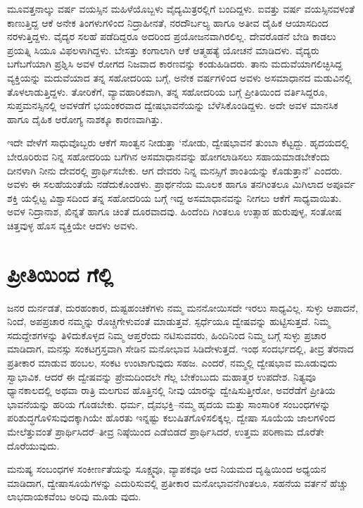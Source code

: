 ಮೂವತ್ತನಾಲ್ಕು ವರ್ಷ ವಯಸ್ಸಿನ ಮಹಿಳೆಯೊಬ್ಬಳು ವೈದ್ಯಮಿತ್ರರಲ್ಲಿಗೆ ಬಂದಿದ್ದಳು. ಐವತ್ತು ವರ್ಷ ವಯಸ್ಸಿನವಳಂತೆ ಕಾಣುತ್ತಿದ್ದ ಆಕೆ ಅನೇಕ ತಿಂಗಳುಗಳಿಂದ ನಿದ್ರಾಹೀನತೆ, ನರದೌರ್ಬಲ್ಯ ಹಾಗೂ ಅತೀವ ದೈಹಿಕ ಆಯಾಸದಿಂದ ನರಳುತ್ತಿದ್ದಳು. ವೈದ್ಯರ ಸಲಹೆ ಪಡೆದಿದ್ದರೂ ಅದರಿಂದ ಪ್ರಯೋಜನವಾಗಿರಲಿಲ್ಲ. ದೇವರೊಡನೆ ಬೇಡಿ ಕಾಡಲು ಪ್ರಯತ್ನಿ ಸಿಯೂ ವಿಫಲಳಾಗಿದ್ದಳು. ಬೇಸತ್ತು ಕಂಗಾಲಾಗಿ ಆಕೆ ಆತ್ಮಹತ್ಯೆ ಯೋಚನೆ ಮಾಡಿದಳು. ವೈದ್ಯರು ಬಗೆಬಗೆಯಾಗಿ ಪ್ರಶ್ನಿಸಿ ಅವಳ ರೋಗದ ನಿಜವಾದ ಕಾರಣವನ್ನು ಕಂಡುಹಿಡಿದರು. ತಾನು ಮದುವೆಯಾಗಲಿಚ್ಛಿಸಿದ್ದ ವ್ಯಕ್ತಿಯನ್ನು ಮದುವೆಯಾದ ತನ್ನ ಸಹೋದರಿಯ ಬಗ್ಗೆ, ಅನೇಕ ವರ್ಷಗಳಿಂದ ಅವಳು ಅಸಮಾಧಾನದ ಮಡುವಿನಲ್ಲಿ ತೊಳಲಾಡುತ್ತಿದ್ದಳು. ತೋರಿಕೆಗೆ, ವ್ಯಾವಹಾರಿಕವಾಗಿ, ತನ್ನ ಸಹೋದರಿಯ ಬಗ್ಗೆ ಪ್ರೀತಿಯಿಂದ ವರ್ತಿಸಿದ್ದರೂ, ಸುಪ್ತಮನಸ್ಸಿನಲ್ಲಿ ಅವಳಡೆಗೆ ಭಯಂಕರವಾದ ದ್ವೇಷಭಾವನೆಯನ್ನು ಬೆಳೆಸಿಕೊಂಡಿದ್ದಳು. ಅದೇ ಅವಳ ಮಾನಸಿಕ ಹಾಗೂ ದೈಹಿಕ ಆರೋಗ್ಯ ನಾಶಕ್ಕೂ ಕಾರಣವಾಗಿತ್ತು.

ಇದೇ ವೇಳೆಗೆ ಸಾಧುವೊಬ್ಬರು ಆಕೆಗೆ ಸಾಂತ್ವನ ನೀಡುತ್ತಾ ‘ನೋಡು, ದ್ವೇಷಭಾವನೆ ತುಂಬಾ ಕೆಟ್ಟದ್ದು. ಹೃದಯದಲ್ಲಿ ಬೇರೂರಿರುವ ನಿನ್ನ ಸಹೋದರಿಯ ಬಗೆಗಿನ ಅಸಮಾಧಾನವನ್ನು ಹೋಗಲಾಡಿಸಲು ಸಹಾಯಮಾಡಬೇಕೆಂದು ದೀನಳಾಗಿ ನೀನು ದೇವರಲ್ಲಿ ಪ್ರಾರ್ಥಿಸಬೇಕು. ಆಗ ದೇವರು ನಿನ್ನ ಮನಸ್ಸಿಗೆ ಶಾಂತಿಯನ್ನು ಕೊಡುತ್ತಾನೆ’ ಎಂದರು. ಅವಳು ಈ ಸಲಹೆಯಂತೆಯೆ ನಡೆದುಕೊಂಡಳು. ಪ್ರಾರ್ಥನೆಯ ಮೂಲಕ ಹಾಗೂ ತನಗಿಂತಲೂ ಮಿಗಿಲಾದ ಅಪೂರ್ವ ಶಕ್ತಿ ಯಲ್ಲಿಟ್ಟ ವಿಶ್ವಾಸದಿಂದ ತನ್ನ ಸಹೋದರಿಯ ಬಗ್ಗೆ ಇದ್ದ ಅಸಮಾಧಾನವನ್ನು ನೀಗಲು ಆಕೆಗೆ ಸಾಧ್ಯವಾಯಿತು. ಅವಳ ನಿದ್ರಾನಾಶ, ಖಿನ್ನತೆ ಹಾಗೂ ಚಿಂತೆ ದೂರವಾದವು. ಹಿಂದೆಂದಿ ಗಿಂತಲೂ ಉತ್ಸಾಹ ಹುರುಪುಳ್ಳ, ಸಂತೋಷ ಚಿತ್ತವುಳ್ಳ ಹೊಸ ವ್ಯಕ್ತಿಯೇ ಆದಳು ಅವಳು.


\section{ಪ್ರೀತಿಯಿಂದ ಗೆಲ್ಲಿ}

ಜನರ ದುರ್ನಡತೆ, ದುರಹಂಕಾರ, ದುಷ್ಟಹಂಚಿಕೆಗಳು ನಮ್ಮ ಮನನೋಯಿಸದೇ ಇರಲು ಸಾಧ್ಯವಿಲ್ಲ. ಸುಳ್ಳು ಆಪಾದನೆ, ನಿಂದೆ, ಅಪಪ್ರಚಾರ ನಮ್ಮನ್ನು ರೊಚ್ಚಿಗೇಳುವಂತೆ ಮಾಡುತ್ತವೆ. ಸ್ಪರ್ಧೆಯೂ ದ್ವೇಷವನ್ನು ಹುಟ್ಟಿಸುತ್ತದೆ. ನಿಮ್ಮ ಸದುದ್ದೇಶಗಳನ್ನು ತಿಳಿದುಕೊಳ್ಳದ ನಿಮ್ಮ ಆಪ್ತರೆಂದು ನಟಿಸುವವರು, ಹಿಂದಿನಿಂದ ನಿಮ್ಮ ಬಗ್ಗೆ ಸುಳ್ಳು ಪ್ರಚಾರ ಮಾಡಿದಾಗ, ಮನಸ್ಸು ಸಂಕಟಗ್ರಸ್ತವಾಗಿ ಸೇಡಿನ ಮನೋಭಾವ ಸಿಡಿದೇಳುತ್ತದೆ. ಇಂಥ ಸಂದರ್ಭದಲ್ಲಿ, ತೀವ್ರ ತೆರನಾದ ಪ್ರತೀಕಾರ ಮಾಡುವ ಹಂಬಲ, ಸಂಕಟ ಉಂಟಾಗುವುದು ಸಹಜ. ಎಂದರೆ, ನಮ್ಮಲ್ಲಿ ದ್ವೇಷಭಾವ ಮೂಡುವುದು ಸ್ವಾಭಾವಿಕ. ಆದರೆ ಈ ದ್ವೇಷವನ್ನು ಪ್ರೇಮದಿಂದಲೇ ಗೆಲ್ಲ ಬೇಕೆಂಬುದು ಮಹಾತ್ಮರ ಉಪದೇಶ. ನಿತ್ಯವೂ ಧ್ಯಾನಕಾಲದಲ್ಲಿ ಅಥವಾ ರಾತ್ರಿ ಮಲಗುವ ಹೊತ್ತಿನಲ್ಲಿ ನೀವು ಯಾರನ್ನು ದ್ವೇಷಿಸುತ್ತೀರೋ, ಅವರೆಡೆಗೆ ಪ್ರೀತಿಯ ಭಾವನೆಯನ್ನು ಹರಿಯ ಗೊಡಬೇಕು. ಧರ್ಮ, ದೈವಭಕ್ತಿ–ನಮ್ಮ ಹೃದಯ ಮತ್ತು ಸಾಂಸಾರಿಕ ಸಂಬಂಧಗಳನ್ನು ಪರಿಶುದ್ಧಗೊಳಿಸುವುದಕ್ಕಾಗಿಯೇ ಹೊರತು ಇನ್ನಷ್ಟು ಕಲುಷಿತಗೊಳಿಸಲಿಕ್ಕಲ್ಲ. ದ್ವೇಷಾ ಸೂಯೆಯ ಜಾಲಗಳಿಂದ ಮೇಲೆತ್ತುವಂತೆ ಪ್ರಾರ್ಥಿಸಿದರೆ–ತೀವ್ರ ನಿಷ್ಠೆಯಿಂದ ಎಡೆಬಿಡದೆ ಪ್ರಾರ್ಥಿಸಿದರೆ, ಉತ್ತಮ ಪರಿಣಾಮ ದೊರೆತೇ ದೊರೆಯುವುದು.

ಮನುಷ್ಯ ಸಂಬಂಧಗಳ ಸಂಕೀರ್ಣತೆಯನ್ನು ಸೂಕ್ಷ್ಮವೂ, ವ್ಯಾಪಕವೂ ಆದ ನಿಯಮದ ದೃಷ್ಟಿಯಿಂದ ಅಧ್ಯಯನ ಮಾಡಿದಾಗ, ದ್ವೇಷಾಸೂಯೆಗಳನ್ನು ಎದುರಿಸುವಲ್ಲಿ ಪ್ರತೀಕಾರ ಮನೋಭಾವನೆಗಿಂತಲೂ, ಸಹನೆಯ ವರ್ತನೆ ಹೆಚ್ಚು ಲಾಭದಾಯಕವೆಂಬ ಅರಿವು ಮೂಡು ವುದು.

